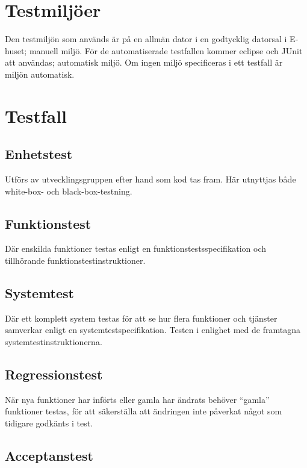 \documentclass[a4paper]{article}
\begin{document}
\section{Testmiljöer}

Den testmiljön som används är på en allmän dator i en godtycklig datorsal i E-huset; 
manuell miljö. För de automatiserade testfallen kommer eclipse och JUnit att användas;
automatisk miljö. Om ingen miljö specificeras i ett testfall är miljön automatisk.

\section{Testfall}

\subsection{Enhetstest}

Utförs av utvecklingsgruppen efter hand som kod tas fram. Här utnyttjas både white-box- och black-box-testning.

\subsection{Funktionstest}

Där enskilda funktioner testas enligt en funktionstestsspecifikation och tillhörande funktionstestinstruktioner. 

\subsection{Systemtest}

Där ett komplett system testas för att se hur flera funktioner och tjänster samverkar enligt en systemtestspecifikation. Testen i enlighet med de framtagna systemtestinstruktionerna. 

\subsection{Regressionstest}

När nya funktioner har införts eller gamla har ändrats behöver ``gamla'' funktioner testas, för att säkerställa att ändringen inte påverkat något som tidigare godkänts i test.

\subsection{Acceptanstest}
\end{document}
